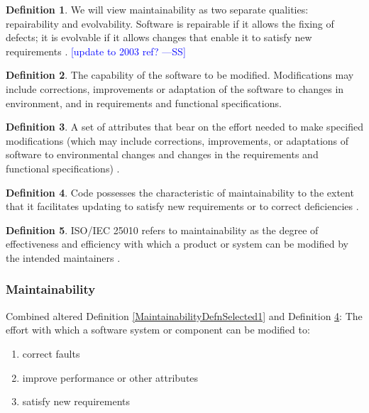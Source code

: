 \documentclass[letterpaper, cleveref]{lipics-v2019}
\newcommand{\authornote}[3]{\textcolor{#1}{[#3 ---#2]}}
\newcommand{\authornote}[3]{}
\newcommand{\wss}[1]{\authornote{blue}{SS}{#1}} %
\theoremstyle{definition}
\newtheorem{defn}{Definition}
\begin{document}
\begin{defn}
  We will view maintainability as two separate qualities: repairability and
  evolvability. Software is repairable if it allows the fixing of defects;
  it is evolvable if it allows changes that enable it to satisfy new
  requirements \citep{ghezzi1991fundamentals}. \wss{update to 2003 ref?}
\end{defn}

\begin{defn}
  The capability of the software to be modified.  Modifications may include
  corrections, improvements or adaptation of the software to changes in
  environment, and in requirements and functional specifications.
  \cite{ISO9126} %
\end{defn}

\begin{defn}
  A set of attributes that bear on the effort needed to make specified
  modifications (which may include corrections, improvements, or adaptations of
  software to environmental changes and changes in the requirements and
  functional specifications) \citep{pfleeger2006software}.
\end{defn}

\begin{defn} \label{MaintainabilityDefnSelected2}
  Code possesses the characteristic of maintainability to the extent that it
  facilitates updating to satisfy new requirements or to correct deficiencies
  \citep{boehm2007software}.
\end{defn}

\begin{defn}
  ISO/IEC 25010 refers to maintainability as the degree of effectiveness and
  efficiency with which a product or system can be modified by the intended
  maintainers \citep{ISO/IEC25010}. %
\end{defn}

\begin{mybox}
\subsubsection*{Maintainability}
Combined altered Definition \ref{MaintainabilityDefnSelected1} and Definition
\ref{MaintainabilityDefnSelected2}: The effort with which a software system or
component can be modified to:
\begin{enumerate}
	\item correct faults
	\item improve performance or other
	attributes
	\item satisfy new requirements
\end{enumerate}
\end{mybox}
\end{document}
